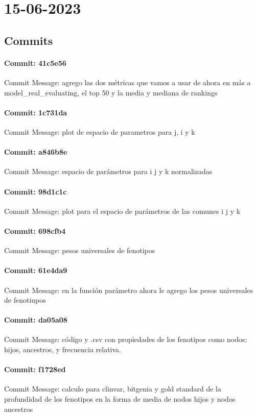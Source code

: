 \documentclass{article}
\begin{document}
\section{15-06-2023}
\subsection{Commits}
\paragraph{Commit: 41c5e56}
Commit Message: agrego las dos métricas que vamos a usar de ahora en más a model_real_evaluating, el top 50 y la media y mediana de rankings

\paragraph{Commit: 1c731da}
Commit Message: plot de espacio de parametros para j, i y k

\paragraph{Commit: a846b8e}
Commit Message: espacio de parámetros para i j y k normalizadas

\paragraph{Commit: 98d1c1c}
Commit Message: plot para el espacio de parámetros de las comunes i j y k

\paragraph{Commit: 698cfb4}
Commit Message: pesos universales de fenotipos

\paragraph{Commit: 61e4da9}
Commit Message: en la función parámetro ahora le agrego los pesos universales de fenotiupos

\paragraph{Commit: da05a08}
Commit Message: código y .csv con propiedades de los fenotipos como nodos: hijos, ancestros, y frecuencia relativa.

\paragraph{Commit: f1728ed}
Commit Message: calculo para clinvar, bitgenia y gold standard de la profundidad de los fenotipos en la forma de media de nodos hijos y nodos ancestros
\end{document}

